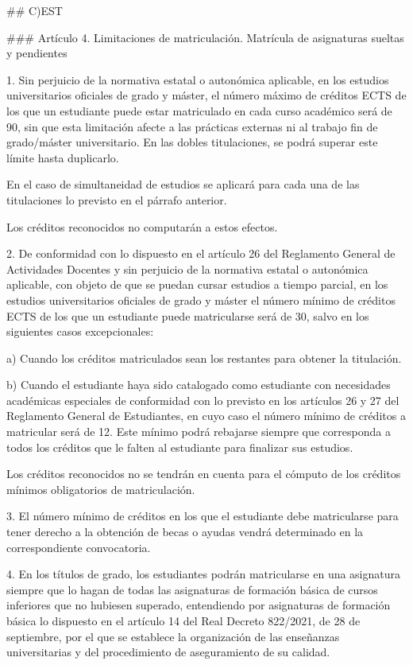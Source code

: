 \documentclass{article}
\begin{document}
\begin{itemize}
\begin{itemize}
\begin{scriptsize}
                  \#\# C)EST

                  \#\#\# Artículo 4. Limitaciones de matriculación. Matrícula de asignaturas sueltas y pendientes

                  1. Sin perjuicio de la normativa estatal o autonómica aplicable, en los estudios universitarios oficiales de grado y máster, el número máximo de créditos ECTS de los que un estudiante puede estar matriculado en cada curso académico será de 90, sin que esta limitación afecte a las prácticas externas ni al trabajo fin de grado/máster universitario. En las dobles titulaciones, se podrá superar este límite hasta duplicarlo.

                  En el caso de simultaneidad de estudios se aplicará para cada una de las titulaciones lo previsto en el párrafo anterior.

                  Los créditos reconocidos no computarán a estos efectos.

                  2. De conformidad con lo dispuesto en el artículo 26 del Reglamento General de Actividades Docentes y sin perjuicio de la normativa estatal o autonómica aplicable, con objeto de que se puedan cursar estudios a tiempo parcial, en los estudios universitarios oficiales de grado y máster el número mínimo de créditos ECTS de los que un estudiante puede matricularse será de 30, salvo en los siguientes casos excepcionales:

                  a) Cuando los créditos matriculados sean los restantes para obtener la titulación.

                  b) Cuando el estudiante haya sido catalogado como estudiante con necesidades académicas especiales de conformidad con lo previsto en los artículos 26 y 27 del Reglamento General de Estudiantes, en cuyo caso el número mínimo de créditos a matricular será de 12. Este mínimo podrá rebajarse siempre que corresponda a todos los créditos que le falten al estudiante para finalizar sus estudios.

                  Los créditos reconocidos no se tendrán en cuenta para el cómputo de los créditos mínimos obligatorios de matriculación.

                  3. El número mínimo de créditos en los que el estudiante debe matricularse para tener derecho a la obtención de becas o ayudas vendrá determinado en la correspondiente convocatoria.

                  4. En los títulos de grado, los estudiantes podrán matricularse en una asignatura siempre que lo hagan de todas las asignaturas de formación básica de cursos inferiores que no hubiesen superado, entendiendo por asignaturas de formación básica lo dispuesto en el artículo 14 del Real Decreto 822/2021, de 28 de septiembre, por el que se establece la organización de las enseñanzas universitarias y del procedimiento de aseguramiento de su calidad.


\end{scriptsize}
\end{itemize}
\end{itemize}
\end{document}
